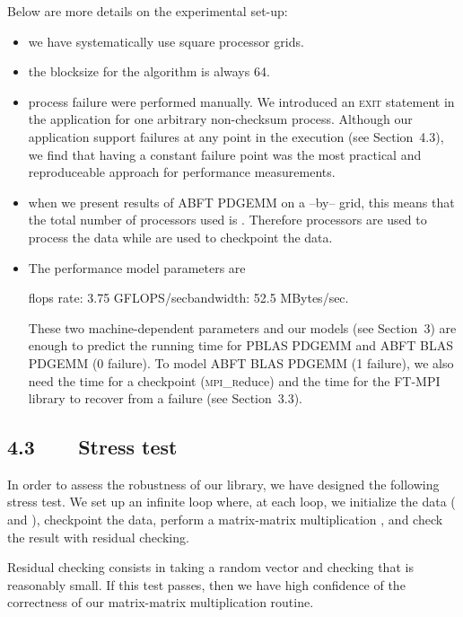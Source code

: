 \documentclass[pdftex,11pt]{article}
\begin{document}
Below are more details on the experimental set-up:
\begin{itemize}
\item we have systematically use square processor grids.
\item the blocksize for the algorithm is always 64.
\item process failure were performed manually. We introduced an
  \textsc{exit} statement in the application for one arbitrary
  non-checksum process.  Although our application support failures at
  any point in the execution (see
  Section~\color{DodgerBlue4}4.3\color{black}), we find that having
  a constant failure point was the most practical and reproduceable
  approach for performance measurements.
\item when we present results of ABFT PDGEMM on a --by-- grid,
  this means that the total number of processors used is
  . Therefore  processors are used to process the data
  while  are used to checkpoint the data.
\item The performance model parameters are
  \begin{center}flops rate: 3.75 GFLOPS/sec\hspace{1cm}bandwidth: 52.5
    MBytes/sec.\end{center} These two machine-dependent parameters and
  our models (see Section~\color{DodgerBlue4}3\color{black}) are
  enough to predict the running time for PBLAS PDGEMM and ABFT BLAS
  PDGEMM (0 failure).  To model ABFT BLAS PDGEMM (1 failure), we also
  need the time for a checkpoint (\textsc{mpi\_r}educe) and the time
  for the FT-MPI library to recover from a failure (see
  Section~\color{DodgerBlue4}3.3\color{black}).
\end{itemize}

\subsection*{\color{DodgerBlue4} 4.3~~~~Stress test}

In order to assess the robustness of our library, we have designed the
following stress test.  We set up an infinite loop where, at each
loop, we initialize the data ( and ), checkpoint the data,
perform a matrix-matrix multiplication , and check
the result with residual checking.

Residual checking consists in taking a random vector  and checking
that  is reasonably small. If this test passes, then we have high
confidence of the correctness of our matrix-matrix multiplication
routine.
\end{document}
